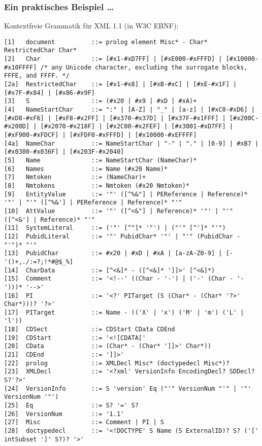 \documentclass[aspectratio=1610,onlymath]{beamer}
\begin{document}
\begin{frame}[fragile]\frametitle{Ein praktisches Beispiel \ldots}

\pause
Kontextfreie Grammatik für XML 1.1 (in W3C EBNF):

\linespread{0.6}
\fontsize{2.3}{4}\selectfont
\begin{verbatim}
[1]   document          ::= prolog element Misc* - Char* RestrictedChar Char*
[2]   Char              ::= [#x1-#xD7FF] | [#xE000-#xFFFD] | [#x10000-#x10FFFF] /* any Unicode character, excluding the surrogate blocks, FFFE, and FFFF. */
[2a]  RestrictedChar    ::= [#x1-#x8] | [#xB-#xC] | [#xE-#x1F] | [#x7F-#x84] | [#x86-#x9F]
[3]   S                 ::= (#x20 | #x9 | #xD | #xA)+
[4]   NameStartChar     ::= ":" | [A-Z] | "_" | [a-z] | [#xC0-#xD6] | [#xD8-#xF6] | [#xF8-#x2FF] | [#x370-#x37D] | [#x37F-#x1FFF] | [#x200C-#x200D] | [#x2070-#x218F] | [#x2C00-#x2FEF] | [#x3001-#xD7FF] | [#xF900-#xFDCF] | [#xFDF0-#xFFFD] | [#x10000-#xEFFFF]
[4a]  NameChar          ::= NameStartChar | "-" | "." | [0-9] | #xB7 | [#x0300-#x036F] | [#x203F-#x2040]
[5]   Name              ::= NameStartChar (NameChar)*
[6]   Names             ::= Name (#x20 Name)*
[7]   Nmtoken           ::= (NameChar)+
[8]   Nmtokens          ::= Nmtoken (#x20 Nmtoken)*
[9]   EntityValue       ::= '"' ([^%&"] | PEReference | Reference)* '"' | "'" ([^%&'] | PEReference | Reference)* "'"
[10]  AttValue          ::= '"' ([^<&"] | Reference)* '"' | "'" ([^<&'] | Reference)* "'"
[11]  SystemLiteral     ::= ('"' [^"]* '"') | ("'" [^']* "'")
[12]  PubidLiteral      ::= '"' PubidChar* '"' | "'" (PubidChar - "'")* "'"
[13]  PubidChar         ::= #x20 | #xD | #xA | [a-zA-Z0-9] | [-'()+,./:=?;!*#@$_%]
[14]  CharData          ::= [^<&]* - ([^<&]* ']]>' [^<&]*)
[15]  Comment           ::= '<!--' ((Char - '-') | ('-' (Char - '-')))* '-->'
[16]  PI                ::= '<?' PITarget (S (Char* - (Char* '?>' Char*)))? '?>'
[17]  PITarget          ::= Name - (('X' | 'x') ('M' | 'm') ('L' | 'l'))
[18]  CDSect            ::= CDStart CData CDEnd
[19]  CDStart           ::= '<![CDATA['
[20]  CData             ::= (Char* - (Char* ']]>' Char*))
[21]  CDEnd             ::= ']]>'
[22]  prolog            ::= XMLDecl Misc* (doctypedecl Misc*)?
[23]  XMLDecl           ::= '<?xml' VersionInfo EncodingDecl? SDDecl? S?'?>'
[24]  VersionInfo       ::= S 'version' Eq ("'" VersionNum "'" | '"' VersionNum '"')
[25]  Eq                ::= S? '=' S?
[26]  VersionNum        ::= '1.1'
[27]  Misc              ::= Comment | PI | S
[28]  doctypedecl       ::= '<!DOCTYPE' S Name (S ExternalID)? S? ('[' intSubset ']' S?)? '>'

\end{verbatim}
\end{frame}
\end{document}
